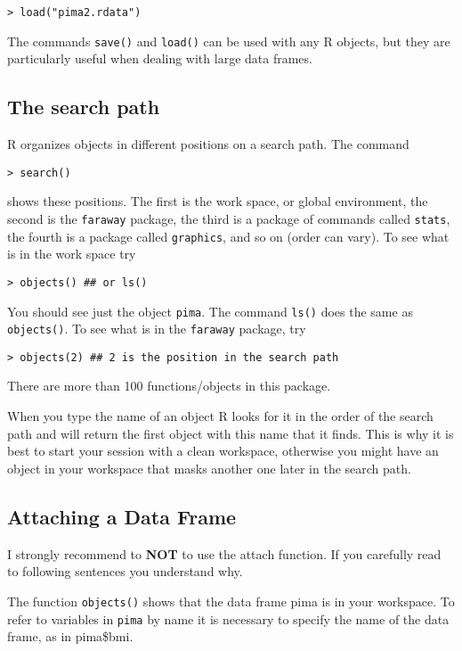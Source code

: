 \documentclass[12pt]{article}
\begin{document}
\begin{verbatim}
> load("pima2.rdata")
\end{verbatim}

The commands \texttt{save()} and \texttt{load()} can be used with any R objects, but they are particularly useful when dealing with large data frames.

\subsection{The search path}
R organizes objects in different positions on a search path. The command
\begin{verbatim}
> search()
\end{verbatim}

shows these positions. The first is the work space, or global environment, the second is the \texttt{faraway} package, the third is a package of commands called \texttt{stats}, the fourth is a package called \texttt{graphics},
and so on (order can vary). To see what is in the work space try

\begin{verbatim}
> objects() ## or ls()
\end{verbatim}

You should see just the object \texttt{pima}. The command \texttt{ls()} does the same as \texttt{objects()}. To see what is in the \texttt{faraway} package, try

\begin{verbatim}
> objects(2) ## 2 is the position in the search path
\end{verbatim}

There are more than 100 functions/objects in this package.

When you type the name of an object R looks for it in the order of the search path and will return the first object with this name that it finds. This is why it is best to start your session
with a clean workspace, otherwise you might have an object in your workspace that masks another one later in the search path.

\subsection{Attaching a Data Frame}

I strongly recommend to \textbf{NOT} to use the attach function. If you carefully read to following sentences you understand why.

The function \texttt{objects()} shows that the data frame pima is in your workspace. To refer to variables in \texttt{pima} by name it is necessary to specify the name of the data frame, as in
pima\$bmi. 
\end{document}
